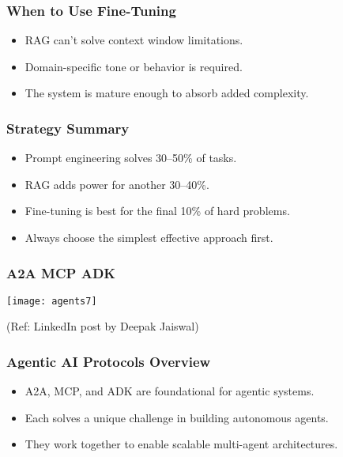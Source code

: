 \begin{frame}[fragile]\frametitle{When to Use Fine-Tuning}
    \begin{itemize}
        \item RAG can't solve context window limitations.
        \item Domain-specific tone or behavior is required.
        \item The system is mature enough to absorb added complexity.
    \end{itemize}
\end{frame}

\begin{frame}[fragile]\frametitle{Strategy Summary}
    \begin{itemize}
        \item Prompt engineering solves 30--50\% of tasks.
        \item RAG adds power for another 30--40\%.
        \item Fine-tuning is best for the final 10\% of hard problems.
        \item Always choose the simplest effective approach first.
    \end{itemize}
\end{frame}

\begin{frame}[fragile]\frametitle{A2A MCP ADK}
	
	\begin{center}
	\texttt{[image: agents7]}
	\end{center}
	
{\tiny (Ref: LinkedIn post by Deepak Jaiswal)}

\end{frame}

\begin{frame}[fragile]\frametitle{Agentic AI Protocols Overview}
    \begin{itemize}
        \item A2A, MCP, and ADK are foundational for agentic systems.
        \item Each solves a unique challenge in building autonomous agents.
        \item They work together to enable scalable multi-agent architectures.
    \end{itemize}
\end{frame}

